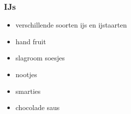 \subsubsection{IJs}
\begin{itemize}
	\item	verschillende soorten  ijs en ijstaarten
	\item	hand fruit
	\item	slagroom soesjes
	\item	nootjes
	\item	smarties
	\item	chocolade saus
\end{itemize}

